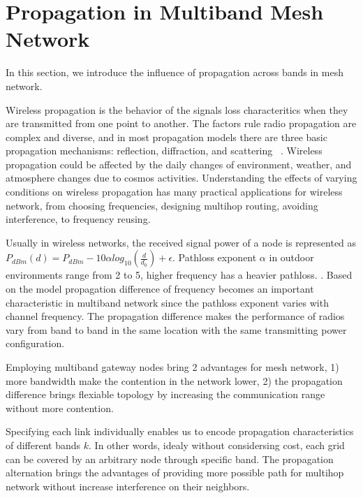 \section{Propagation in Multiband Mesh Network}
\label{sec:propagation}

In this section, we introduce the influence of propagation across bands in mesh network.

Wireless propagation is the behavior of the signals loss characteritics when they are transmitted from one point to another.
The factors rule radio propagation are complex and diverse, and in most propagation models there are three basic propagation mechanisms: reflection, diffraction, and scattering ~\cite{andersen1995propagation}.
Wireless propagation could be affected by the daily changes of environment, weather, and atmosphere changes due to cosmos activities. 
Understanding the effects of varying conditions on wireless propagation has many practical applications for wireless network, from choosing frequencies, designing multihop routing, avoiding interference, to frequency reusing.

Usually in wireless networks, the received signal power of a node is represented as 
$P_{dBm}(d)=P_{dBm}-10\alpha log_{10}(\frac{d}{d_0})+\epsilon$. 
Pathloss exponent $\alpha$ in outdoor environments range from 2 to 5, higher frequency has a heavier pathloss. \cite{camp2006measurement}. 
Based on the model propagation difference of frequency becomes an important characteristic in multiband network since the pathloss exponent varies with channel frequency.
The propagation difference makes the performance of radios vary from band to band in the same location with the same transmitting power configuration.

Employing multiband gateway nodes bring 2 advantages for mesh network, 1) more bandwidth make the contention in the network lower,
 2) the propagation difference brings flexiable topology by increasing the communication range without more contention.

Specifying each link individually enables us to encode propagation characteristics of different bands $k$. In other words, idealy without considersing cost, each grid can be covered by an arbitrary node through specific band.  
The propagation alternation brings the advantages of providing more possible path for multihop network without increase interference on their neighbors. 

